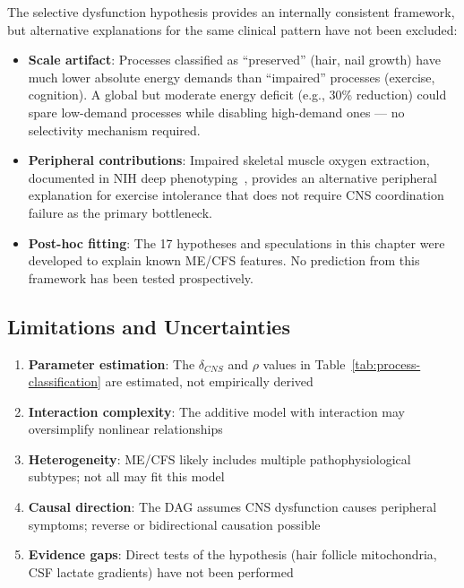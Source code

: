 \begin{limitation}
The selective dysfunction hypothesis provides an internally consistent framework, but alternative explanations for the same clinical pattern have not been excluded:
\begin{itemize}
    \item \textbf{Scale artifact}: Processes classified as ``preserved'' (hair, nail growth) have much lower absolute energy demands than ``impaired'' processes (exercise, cognition). A global but moderate energy deficit (e.g., 30\% reduction) could spare low-demand processes while disabling high-demand ones --- no selectivity mechanism required.
    \item \textbf{Peripheral contributions}: Impaired skeletal muscle oxygen extraction, documented in NIH deep phenotyping~\cite{walitt2024deep}, provides an alternative peripheral explanation for exercise intolerance that does not require CNS coordination failure as the primary bottleneck.
    \item \textbf{Post-hoc fitting}: The 17 hypotheses and speculations in this chapter were developed to explain known ME/CFS features. No prediction from this framework has been tested prospectively.
\end{itemize}
\end{limitation}


\subsection{Limitations and Uncertainties}

\begin{warning}[Limitations]
\begin{enumerate}
    \item \textbf{Parameter estimation}: The $\delta_{CNS}$ and $\rho$ values in Table~\ref{tab:process-classification} are estimated, not empirically derived
    \item \textbf{Interaction complexity}: The additive model with interaction may oversimplify nonlinear relationships
    \item \textbf{Heterogeneity}: ME/CFS likely includes multiple pathophysiological subtypes; not all may fit this model
    \item \textbf{Causal direction}: The DAG assumes CNS dysfunction causes peripheral symptoms; reverse or bidirectional causation possible
    \item \textbf{Evidence gaps}: Direct tests of the hypothesis (hair follicle mitochondria, CSF lactate gradients) have not been performed
\end{enumerate}
\end{warning}


